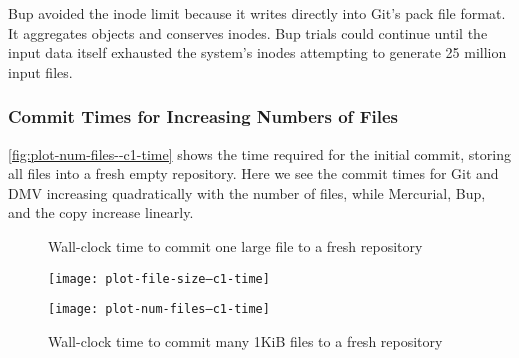 Bup avoided the \gls{inode} limit because it writes directly into Git's pack file format.
It aggregates objects and conserves inodes.
Bup trials could continue until the input data itself exhausted the system's \glspl{inode} attempting to generate \num{25} million input files.

%


\subsubsection{Commit Times for Increasing Numbers of Files}

\autoref{fig:plot-num-files--c1-time} shows the time required for the initial \gls{commit}, storing all files into a fresh empty \gls{repository}.
Here we see the commit times for Git and DMV increasing quadratically with the number of files, while Mercurial, Bup, and the copy increase linearly.

\begin{figure}
    \centering
    \begin{minipage}{.5\textwidth}

        \caption{Wall-clock time to commit one large file to a fresh repository}
        \label{fig:plot-file-size--c1-time}
        \centering
        \texttt{[image: plot-file-size--c1-time]}

    \end{minipage}%
    \begin{minipage}{.5\textwidth}

        \caption{Wall-clock time to commit many 1KiB files to a fresh repository}
        \label{fig:plot-num-files--c1-time}
        \centering
        \texttt{[image: plot-num-files--c1-time]}

    \end{minipage}
\end{figure}
